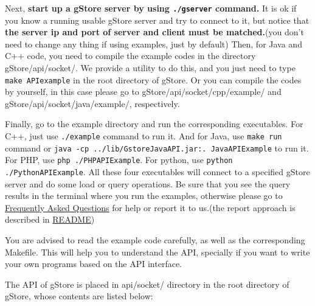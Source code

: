 \documentclass[titlepage, a4paper, 12pt]{article}
\begin{document}
Next, \textbf{start up a gStore server by using \texttt{./gserver}
command.} It is ok if you know a running usable gStore server and try to
connect to it, but notice that \textbf{the server ip and port of server
and client must be matched.}(you don't need to change any thing if using
examples, just by default) Then, for Java and C++ code, you need to compile the example codes
in the directory gStore/api/socket/. We provide a utility to do this, and you
just need to type \texttt{make\ APIexample} in the root directory of
gStore. Or you can compile the codes by yourself, in this case please go
to gStore/api/socket/cpp/example/ and gStore/api/socket/java/example/, respectively.

Finally, go to the example directory and run the corresponding
executables. For C++, just use \texttt{./example} command to run it. And
for Java, use \texttt{make\ run} command or \texttt{java\ -cp\ ../lib/GstoreJavaAPI.jar:.\ JavaAPIExample} to run
it. For PHP, use \texttt{php ./PHPAPIExample}. For python, use \texttt{python ./PythonAPIExample}. All these four executables will connect to a specified gStore server
and do some load or query operations. Be sure that you see the query
results in the terminal where you run the examples, otherwise please go
to \hyperref[chapter11]{Frequently Asked Questions} for help or report
it to us.(the report approach is described in
\hyperref[chapter00]{README})

You are advised to read the example code carefully, as well as the
corresponding Makefile. This will help you to understand the API,
specially if you want to write your own programs based on the API
interface.


The API of gStore is placed in api/socket/ directory in the root directory of
gStore, whose contents are listed below:
\end{document}
